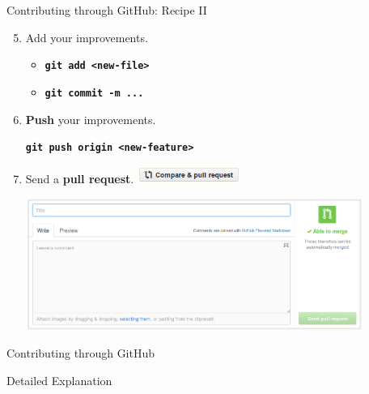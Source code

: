 \documentclass{beamer}
\begin{document}
\begin{frame}{Contributing through GitHub: Recipe II}
  \begin{enumerate}
    \setcounter{enumi}{4}
  \item Add your improvements.
    \begin{itemize}
    \item \texttt{\textbf{git add <new-file>}}
    \item \texttt{\textbf{git commit -m ...}}
    \end{itemize}    
  \item \textbf{Push} your improvements.
    \begin{center}
      \texttt{\textbf{git push origin <new-feature>}}
    \end{center}
  \item Send a \textbf{pull request}.
    \includegraphics[height=0.55cm]{UniBo.IDSEPC.A2022.LavoroCondiviso/github-compare-and-pull-request}
    \begin{center}
      \hbox{\hspace{-0cm}\includegraphics[width=11cm]{UniBo.IDSEPC.A2022.LavoroCondiviso/github-pull-request}}
    \end{center}
  \end{enumerate}
\end{frame}

\begin{frame}{Contributing through GitHub}
  \begin{center}
    Detailed Explanation
\end{center}
\end{frame}
\end{document}
